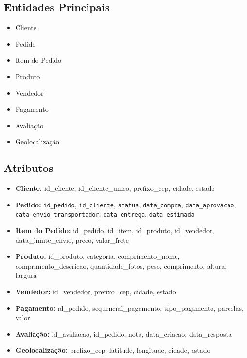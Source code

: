 \documentclass[12pt,a4paper]{article}
\begin{document}
\subsection{Entidades Principais}

\begin{itemize}
    \item Cliente
    \item Pedido
    \item Item do Pedido
    \item Produto
    \item Vendedor
    \item Pagamento
    \item Avaliação
    \item Geolocalização
\end{itemize}

\clearpage
\mbox{}\vspace{-\baselineskip}
\subsection{Atributos}

\begin{itemize}
    \item \textbf{Cliente:} id\_cliente, id\_cliente\_unico, prefixo\_cep, cidade, estado

    \item \textbf{Pedido:} \nolinkurl{id_pedido}, \nolinkurl{id_cliente},
    \nolinkurl{status}, \nolinkurl{data_compra}, \nolinkurl{data_aprovacao},
    \nolinkurl{data_envio_transportador}, \nolinkurl{data_entrega},
    \nolinkurl{data_estimada}

    \item \textbf{Item do Pedido:} id\_pedido, id\_item, id\_produto, id\_vendedor, data\_limite\_envio, preco, valor\_frete

    \item \textbf{Produto:} id\_produto, categoria, comprimento\_nome, comprimento\_descricao, quantidade\_fotos, peso, comprimento, altura, largura

    \item \textbf{Vendedor:} id\_vendedor, prefixo\_cep, cidade, estado

    \item \textbf{Pagamento:} id\_pedido, sequencial\_pagamento, tipo\_pagamento, parcelas, valor

    \item \textbf{Avaliação:} id\_avaliacao, id\_pedido, nota, data\_criacao, data\_resposta

    \item \textbf{Geolocalização:} prefixo\_cep, latitude, longitude, cidade, estado
\end{itemize}
\end{document}
